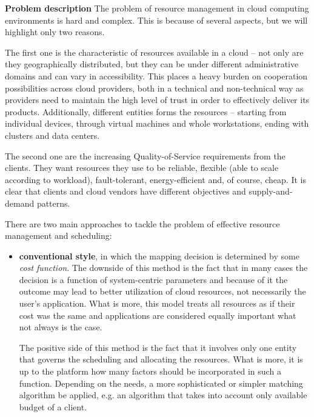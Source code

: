 \begin{asparaenum}
  \item[\textbf{Problem description}]
The problem of resource management in cloud computing environments is hard and complex. This is because of several aspects, but we will highlight only two reasons. 

The first one is the characteristic of resources available in a cloud -- not only are they geographically distributed, but they can be under different administrative domains and can vary in accessibility. This places a heavy burden on cooperation possibilities across cloud providers, both in a technical and non-technical way as providers need to maintain the high level of trust in order to effectively  deliver its products. Additionally, different entities forms the resources -- starting from individual devices, through virtual machines and whole workstations, ending with clusters and data centers.

The second one are the increasing Quality-of-Service requirements from the clients. They want resources they use to be reliable, flexible (able to scale according to workload), fault-tolerant, energy-efficient and, of course, cheap. It is clear that clients and cloud vendors have different objectives and supply-and-demand patterns.

There are two main approaches to tackle the problem of effective resource management and scheduling:
  \begin{itemize}
    \item \textbf{conventional style}, in which the mapping decision is determined by some \emph{cost function}. The downside of this method is the fact that in many cases the decision is a function of system-centric parameters \cite{buyya2002economic} and because of it the outcome may lead to better utilization of cloud resources, not necessarily the user's application. What is more, this model treats all resources as if their cost was the same and applications are considered equally important what not always is the case. 

      The positive side of this method is the fact that it involves only one entity that governs the scheduling and allocating the resources. What is more, it is up to the platform how many factors should be incorporated in such a function. Depending on the needs, a more sophisticated or simpler matching algorithm be applied, e.g. an algorithm that takes into account only available budget of a client.
      

\end{itemize}
\end{asparaenum}
